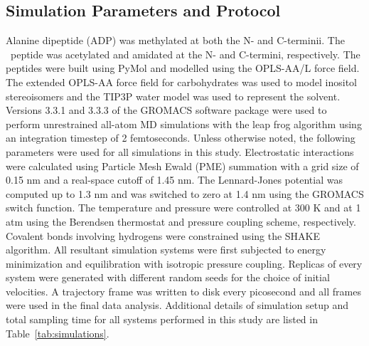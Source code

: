 \subsection{Simulation Parameters and Protocol}
Alanine dipeptide (ADP) was methylated at both the N- and C-terminii. The \gafour\ peptide was acetylated and amidated at the N- and C-termini, respectively. The peptides were built using PyMol\cite{Anonymous:2012p58} and modelled using the OPLS-AA/L force field\cite{Jorgensen:1996p19}. The extended OPLS-AA force field for carbohydrates\cite{Damm:1997p36} was used to model inositol stereoisomers and the TIP3P water model\cite{Jorgensen:1983p40} was used to represent the solvent. Versions 3.3.1 and 3.3.3 of the GROMACS software package\cite{VanDerSpoel:2005p56} were used to perform unrestrained all-atom MD simulations with the leap frog algorithm using an integration timestep of 2 femtoseconds. Unless otherwise noted, the following parameters were used for all simulations in this study. Electrostatic interactions were calculated using Particle Mesh Ewald (PME) summation with a grid size of 0.15 nm and a real-space cutoff of 1.45 nm.\cite{Essmann:1995p51} The Lennard-Jones potential was computed up to 1.3 nm and was switched to zero at 1.4 nm using the GROMACS switch function. The temperature and pressure were controlled at 300 K and at 1 atm using the Berendsen thermostat and pressure coupling scheme, respectively.\cite{Berendsen:1984p26} Covalent bonds involving hydrogens were constrained using the SHAKE algorithm.\cite{Ryckaert:1977p30} All resultant simulation systems were first subjected to energy minimization and equilibration with isotropic pressure coupling. Replicas of every system were generated with different random seeds for the choice of initial velocities. A trajectory frame was written to disk every picosecond and all frames were used in the final data analysis. Additional details of simulation setup and total sampling time for all systems performed in this study are listed in Table~\ref{tab:simulations}.
	
